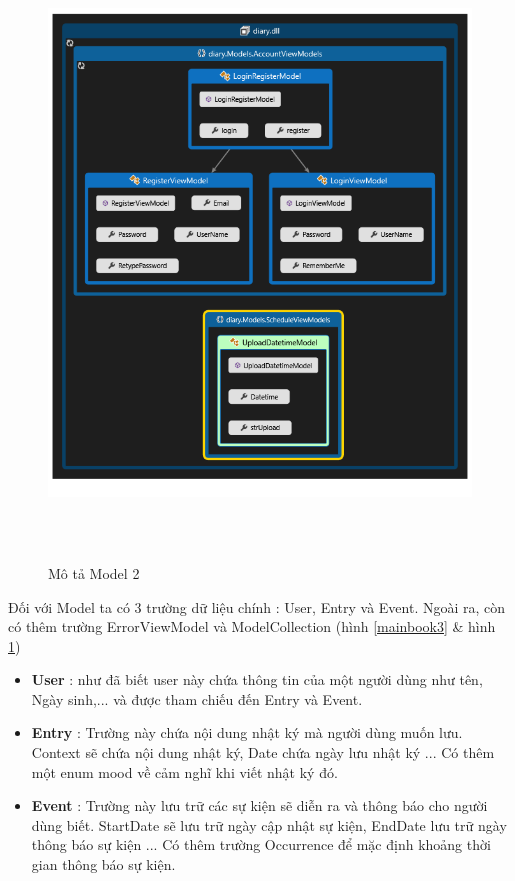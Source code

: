 \documentclass[a4paper]{article}
\begin{document}
\begin{enumerate}
		\begin{figure}[!h]
	  \centering
      \includegraphics[height=460pt,width=400pt]{Images/h5.png}
	  \caption{Mô tả Model 2}
	  \label{mainbook4}
	   \end{figure}


	Đối với Model ta có 3 trường dữ liệu chính : User, Entry và Event. Ngoài ra, còn có thêm trường ErrorViewModel và ModelCollection (hình \ref{mainbook3} \& hình \ref{mainbook4})

	\begin{itemize}
		\item \textbf{User} : như đã biết user này chứa thông tin của một người dùng như tên, Ngày sinh,... và được tham chiếu đến Entry và Event.
		\item \textbf{Entry} : Trường này chứa nội dung nhật ký mà người dùng muốn lưu. Context sẽ chứa nội dung nhật ký, Date chứa ngày lưu nhật ký ... Có thêm một enum mood về cảm nghĩ khi viết nhật ký đó.

		\item \textbf{Event} : Trường này lưu trữ các sự kiện sẽ diễn ra và thông báo cho người dùng biết. StartDate sẽ lưu trữ ngày cập nhật sự kiện, EndDate lưu trữ ngày thông báo sự kiện ... Có thêm trường Occurrence để mặc định khoảng thời gian thông báo sự kiện.




\end{itemize}
\end{enumerate}
\end{document}
